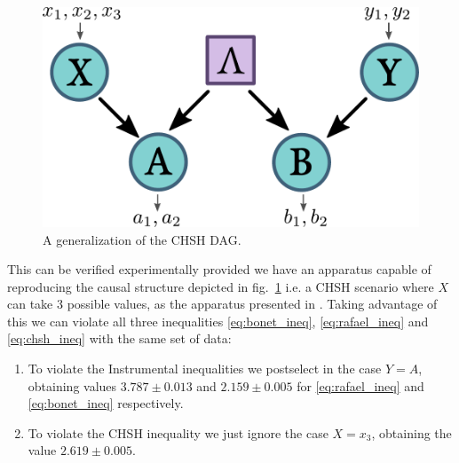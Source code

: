\documentclass[floatfix, twocolumn, aps, prl]{revtex4-1}
\begin{document}
\begin{figure}[h]
    \centering
    \includegraphics[width=.7\columnwidth]{images/genchshdag.pdf}
    \caption{A generalization of the CHSH DAG.}
    \label{fig:genchshdag}
\end{figure}
This can be verified experimentally provided we have an apparatus capable of
reproducing the causal structure depicted in fig.~\ref{fig:genchshdag} i.e. a CHSH scenario
where $X$ can take 3 possible values, as the apparatus presented in
\cite{chaves2018}.
Taking advantage of this we can violate all three inequalities
\eqref{eq:bonet_ineq}, \eqref{eq:rafael_ineq} and \eqref{eq:chsh_ineq} with the same set of
data:
\begin{enumerate}
    \item To violate the Instrumental inequalities we postselect in the case
        $Y = A$, obtaining values $3.787 \pm 0.013$ and $2.159 \pm 0.005$ for \eqref{eq:rafael_ineq} and
        \eqref{eq:bonet_ineq} respectively.
    \item To violate the CHSH inequality we just ignore the case $X = x_3$,
        obtaining the value $2.619 \pm 0.005$.
\end{enumerate}
\end{document}
